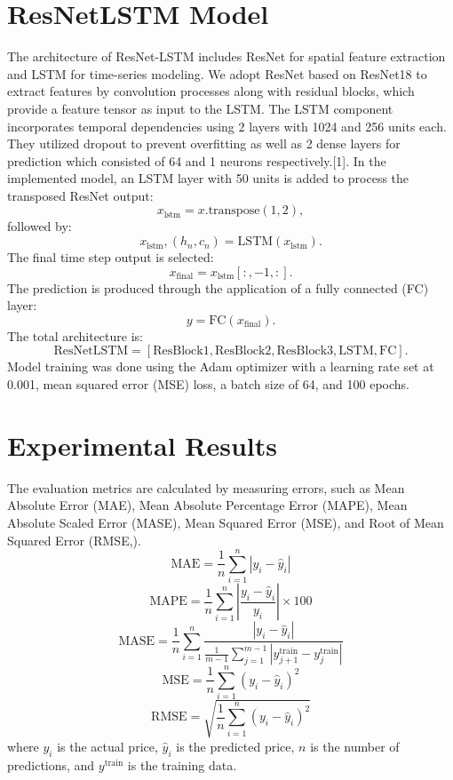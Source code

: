 \documentclass[12pt]{article}
\begin{document}
\section{ResNetLSTM Model}\label{sec:resnetlstm}
The architecture of ResNet-LSTM includes ResNet for spatial feature extraction and LSTM for time-series modeling. We adopt ResNet based on ResNet18 to extract features by convolution processes along with residual blocks, which provide a feature tensor as input to the LSTM. The LSTM component incorporates temporal dependencies using 2 layers with 1024 and 256 units each. They utilized dropout to prevent overfitting as well as 2 dense layers for prediction which consisted of 64 and 1 neurons respectively.[1]. In the implemented model, an LSTM layer with 50 units is added to process the transposed ResNet output:
\begin{equation}
x_{\text{lstm}} = x.\text{transpose}(1, 2), \label{eq:transpose}
\end{equation}
followed by:
\begin{equation}
x_{\text{lstm}}, (h_n, c_n) = \text{LSTM}(x_{\text{lstm}}). \label{eq:lstm}
\end{equation}
The final time step output is selected:
\begin{equation}
x_{\text{final}} = x_{\text{lstm}}[:, -1, :]. \label{eq:final}
\end{equation}
The prediction is produced through the application of a fully connected (FC) layer:
\begin{equation}
y = \text{FC}(x_{\text{final}}). \label{eq:output}
\end{equation}
The total architecture is:
\[
\text{ResNetLSTM} = [\text{ResBlock1}, \text{ResBlock2}, \text{ResBlock3}, \text{LSTM}, \text{FC}].
\]
Model training was done using the Adam optimizer with a learning rate set at 0.001, mean squared error (MSE) loss, a batch size of 64, and 100 epochs.

\section{Experimental Results}
The evaluation metrics are calculated by measuring errors, such as Mean Absolute Error (MAE), Mean Absolute Percentage Error (MAPE), Mean Absolute Scaled Error (MASE), Mean Squared Error (MSE), and Root of Mean Squared Error (RMSE,).
\[
\text{MAE} = \frac{1}{n} \sum_{i=1}^n |y_i - \hat{y}_i|
\]
\[
\text{MAPE} = \frac{1}{n} \sum_{i=1}^n \left| \frac{y_i - \hat{y}_i}{y_i} \right| \times 100
\]
\[
\text{MASE} = \frac{1}{n} \sum_{i=1}^n \frac{|y_i - \hat{y}_i|}{\frac{1}{m-1} \sum_{j=1}^{m-1} |y_{j+1}^{\text{train}} - y_j^{\text{train}}|}
\]
\[
\text{MSE} = \frac{1}{n} \sum_{i=1}^n (y_i - \hat{y}_i)^2
\]
\[
\text{RMSE} = \sqrt{\frac{1}{n} \sum_{i=1}^n (y_i - \hat{y}_i)^2}
\]
where \( y_i \) is the actual price, \( \hat{y}_i \) is the predicted price, \( n \) is the number of predictions, and \( y^{\text{train}} \) is the training data.
\end{document}
